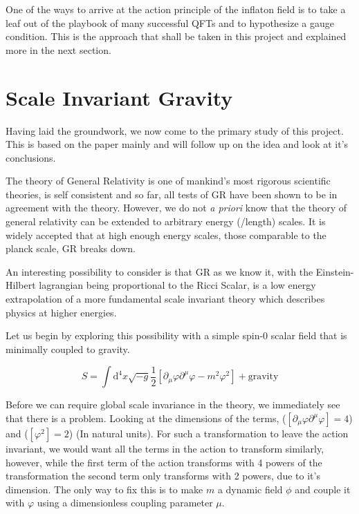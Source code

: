 \documentclass[aps,prd,reprint,preprintnumbers,showpacs,floatfix,nofootinbib,superscript address]{revtex4-2}
\begin{document}
One of the ways to arrive at the action principle of the inflaton field is to take a leaf out of the playbook of many successful QFTs and to hypothesize a gauge condition. This is the approach that shall be taken in this project and explained more in the next section.


\section{Scale Invariant Gravity} \label{Section 3}
Having laid the groundwork, we now come to the primary study of this project. This is based on the paper \cite{barker2024poincaregaugetheoryconformal} mainly and will follow up on the idea and look at it's conclusions. 

The theory of General Relativity is one of mankind's most rigorous scientific theories, is self consistent and so far, all tests of GR have been shown to be in agreement with the theory. However, we do not \textit{a priori} know that the theory of general relativity can be extended to arbitrary energy (/length) scales. It is widely accepted that at high enough energy scales, those comparable to the planck scale, GR breaks down. 

An interesting possibility to consider is that GR as we know it, with the Einstein-Hilbert lagrangian being proportional to the Ricci Scalar, is a low energy extrapolation of a more fundamental scale invariant theory which describes physics at higher energies. 

Let us begin by exploring this possibility with a simple spin-0 scalar field that is minimally coupled to gravity.

\begin{equation}
    S = \int \mathrm{d}^4 x \sqrt{-g} \frac{1}{2} \left[ \partial_\mu \varphi \partial^\mu \varphi - m^2   \varphi^2   \right] + \text{gravity}
\end{equation}

Before we can require global scale invariance in the theory, we immediately see that there is a problem. Looking at the dimensions of the terms, ($[\partial_\mu \varphi \partial^\mu \varphi ] = 4$) and ($[\varphi^2 ] = 2$) (In natural units).  For such a transformation to leave the action invariant, we would want all the terms in the action to transform similarly, however, while the first term of the action transforms with 4 powers of the transformation the second term only transforms with 2 powers, due to it's dimension. The only way to fix this is to make $m$ a dynamic field $\phi$  and couple it with $\varphi$ using a dimensionless coupling parameter $\mu$.
\end{document}
